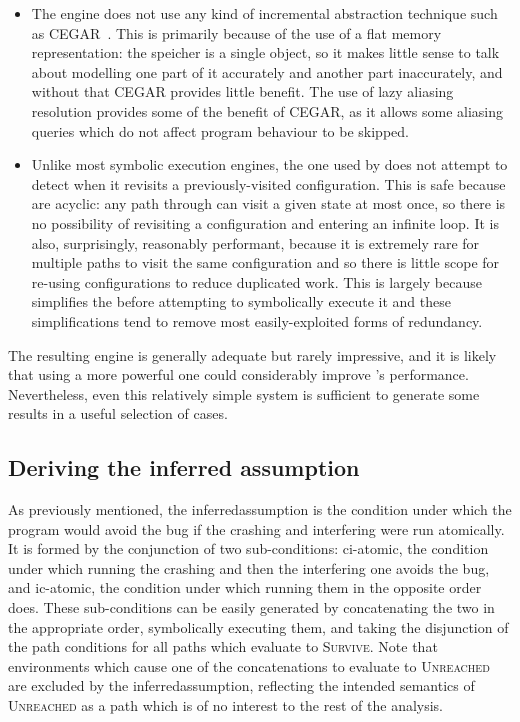\begin{itemize}
\item The engine does not use any kind of incremental abstraction
  technique such as CEGAR~\cite{Clarke2003}.  This is primarily
  because of the use of a flat memory representation: the speicher is
  a single object, so it makes little sense to talk about modelling
  one part of it accurately and another part inaccurately, and without
  that CEGAR provides little benefit.  The use of lazy aliasing
  resolution provides some of the benefit of CEGAR, as it allows some
  aliasing queries which do not affect program behaviour to be
  skipped.

\item Unlike most symbolic execution engines, the one used by
  {\implementation} does not attempt to detect when it revisits a
  previously-visited configuration.  This is safe because
  {\StateMachines} are acyclic: any path through {\AStateMachine} can
  visit a given state at most once, so there is no possibility of
  revisiting a configuration and entering an infinite loop.  It is
  also, surprisingly, reasonably performant, because it is extremely
  rare for multiple paths to visit the same configuration and so there
  is little scope for re-using configurations to reduce duplicated
  work.  This is largely because {\technique} simplifies the
  {\StateMachine} before attempting to symbolically execute it and
  these simplifications tend to remove most easily-exploited forms of
  redundancy.
\end{itemize}
The resulting engine is generally adequate but rarely impressive, and
it is likely that using a more powerful one could considerably improve
{\implementation}'s performance.  Nevertheless, even this relatively
simple system is sufficient to generate some results in a useful
selection of cases.

\subsection{Deriving the inferred assumption}
\label{sect:derive:inferred_assumption}

As previously mentioned, the \gls{inferredassumption} is the condition
under which the program would avoid the bug if the crashing and
interfering {\StateMachines} were run atomically.  It is formed by the
conjunction of two sub-conditions: \gls{ci-atomic}, the condition
under which running the crashing {\StateMachine} and then the
interfering one avoids the bug, and \gls{ic-atomic}, the condition
under which running them in the opposite order does.  These
sub-conditions can be easily generated by concatenating the two
{\StateMachines} in the appropriate order, symbolically executing
them, and taking the disjunction of the path conditions for all paths
which evaluate to \textsc{Survive}.  Note that {\StateMachine}
environments which cause one of the concatenations to evaluate to
\textsc{Unreached} are excluded by the \gls{inferredassumption},
reflecting the intended semantics of \textsc{Unreached} as a path
which is of no interest to the rest of the analysis.

